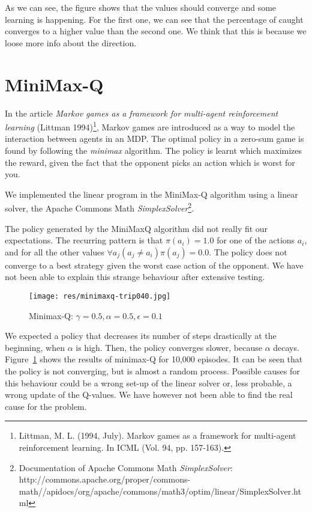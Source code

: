 \documentclass{article}
\begin{document}
As we can see, the figure shows that the values should converge and some
learning is happening. For the first one, we can see that the percentage of
caught converges to a higher value than the second one. We think that this is
because we loose more info about the direction. 
\section{MiniMax-Q}
In the article \emph{Markov games as a framework for multi-agent reinforcement learning} (Littman 1994)\footnote{Littman, M. L. (1994, July). Markov games as a framework for multi-agent reinforcement learning. In ICML (Vol. 94, pp. 157-163).}, Markov games are introduced as a way to model the interaction between agents in an MDP. The optimal policy in a zero-sum game is found by following the \emph{minimax} algorithm. The policy is learnt which maximizes the reward, given the fact that the opponent picks an action which is worst for you.

We implemented the linear program in the MiniMax-Q algorithm using a linear solver, the Apache Commons Math \emph{SimplexSolver}\footnote{Documentation of Apache Commons Math \emph{SimplexSolver}: http://commons.apache.org/proper/commons-math//apidocs/org/apache/commons/math3/optim/linear/SimplexSolver.html}.

The policy generated by the MiniMaxQ algorithm did not really fit our expectations. The recurring pattern is that $\pi(a_i) = 1.0$ for one of the actions $a_i$, and for all the other values $\forall a_j (a_j \neq a_i) \pi(a_j) = 0.0$. The policy does not converge to a best strategy given the worst case action of the opponent. We have not been able to explain this strange behaviour after extensive testing. 

\begin{figure}[!h]
\texttt{[image: res/minimaxq-trip040.jpg]}
\caption{Minimax-Q: $\gamma=0.5, \alpha = 0.5, \epsilon = 0.1$}
\label{fig:minimaxq}
\end{figure}

We expected a policy that decreases its number of steps drastically at the beginning, when $\alpha$ is high. Then, the policy converges slower, because $\alpha$ decays. Figure~\ref{fig:minimaxq} shows the results of minimax-Q for 10,000 episodes. It can be seen that the policy is not converging, but is almost a random process. Possible causes for this behaviour could be a wrong set-up of the linear solver or, less probable, a wrong update of the Q-values. We have however not been able to find the real cause for the problem. %
\end{document}
